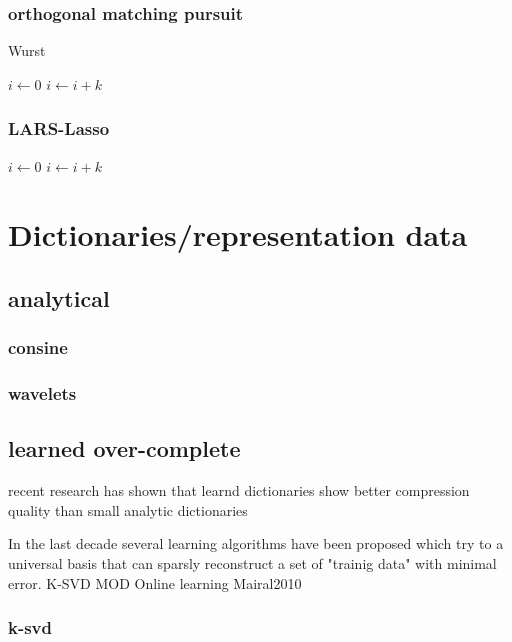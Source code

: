 \subsubsection{orthogonal matching pursuit}
\label{sec:omp}
\begin{algorithm}
\caption{Wurst}
\begin{algorithmic}
        \STATE $i\gets 0$
\ELSE
                \STATE $i\gets i+k$
        \ENDIF
\ENDIF 
\end{algorithmic}

\subsubsection{LARS-Lasso}
\begin{algorithmic}
        \STATE $i\gets 0$
\ELSE
                \STATE $i\gets i+k$
        \ENDIF
\ENDIF 
\end{algorithmic}
\end{algorithm}

\section{Dictionaries/representation data}
\subsection{analytical}
\subsubsection{consine}
\subsubsection{wavelets}

\subsection{learned over-complete}
recent research has shown that learnd dictionaries show better compression quality than small analytic dictionaries \cite{Aharon2006} \cite{Chen1998} 


In the last decade several learning algorithms have been proposed which try to a universal basis that 
can sparsly reconstruct a set of "trainig data" with minimal error. 
K-SVD
MOD
Online learning
Mairal2010

\subsubsection{k-svd}

